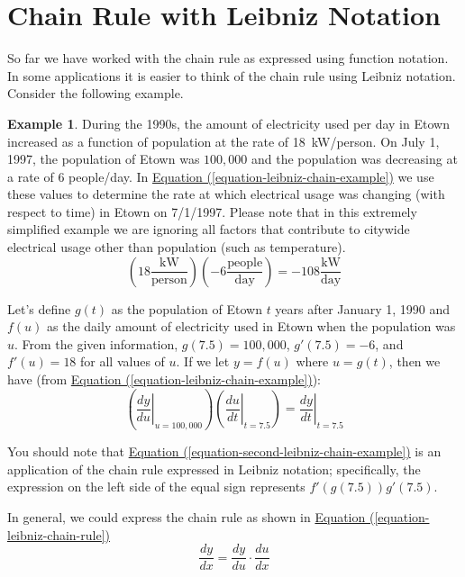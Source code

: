 \documentclass[10pt,oneside,]{book}
\theoremstyle{plain}
\theoremstyle{definition}
\newtheorem{example}[theorem]{Example}
\numberwithin{equation}{section}
\newcommand{\fe}[2]{#1\mathopen{}\left(#2\right)\mathclose{}}
\newcommand{\fd}[1]{#1'}
\newcommand{\lz}[2]{\frac{d#1}{d#2}}
\newcommand{\lzoa}[3]{\left.{\frac{d#1}{d#2}}\right|_{#3}}
\begin{document}
\section[Chain Rule with Leibniz Notation]{Chain Rule with Leibniz Notation}\label{section-chain-rule-and-leibniz}
So far we have worked with the chain rule as expressed using function notation.  In some applications it is easier to think of the chain rule using Leibniz notation. Consider the following example.%
\begin{example}\label{example-17}
During the 1990s, the amount of electricity used per day in Etown increased as a function of population at the rate of \SI{18}{\kilo\watt}/person.  On July 1, 1997, the population of Etown was \(100{,}000\) and the population was decreasing at a rate of 6 people/day.  In \hyperref[equation-leibniz-chain-example]{Equation (\ref{equation-leibniz-chain-example})} we use these values to determine the rate at which electrical usage was changing (with respect to time) in Etown on 7/1/1997.  Please note that in this extremely simplified example we are ignoring all factors that contribute to citywide electrical usage other than population (such as temperature).%
\begin{equation}\left(18\frac{\text{kW}}{\text{person}}\right)\left(-6\frac{\text{people}}{\text{day}}\right)=-108\frac{\text{kW}}{\text{day}}\label{equation-leibniz-chain-example}\end{equation}\par
Let's define \(\fe{g}{t}\)  as the population of Etown \(t\) years after January 1, 1990 and \(\fe{f}{u}\) as the daily amount of electricity used in Etown when the population was \(u\).  From the given information, \(\fe{g}{7.5}=100{,}000\), \(\fe{\fd{g}}{7.5}=-6\), and \(\fe{\fd{f}}{u}=18\) for all values of \(u\).  If we let \(y=\fe{f}{u}\) where \(u=\fe{g}{t}\), then we have (from \hyperref[equation-leibniz-chain-example]{Equation (\ref{equation-leibniz-chain-example})}):%
\begin{equation}\left(\lzoa{y}{u}{u=100{,}000}\right)\left(\lzoa{u}{t}{t=7.5}\right)=\lzoa{y}{t}{t=7.5}\label{equation-second-leibniz-chain-example}\end{equation}\par
You should note that \hyperref[equation-second-leibniz-chain-example]{Equation (\ref{equation-second-leibniz-chain-example})} is an application of the chain rule expressed in Leibniz notation; specifically, the expression on the left side of the equal sign represents \(\fe{\fd{f}}{\fe{g}{7.5}}\fe{\fd{g}}{7.5}\).%
\end{example}
\par
In general, we could express the chain rule as shown in \hyperref[equation-leibniz-chain-rule]{Equation (\ref{equation-leibniz-chain-rule})}%
\begin{equation}\lz{y}{x}=\lz{y}{u}\cdot\lz{u}{x}\label{equation-leibniz-chain-rule}\end{equation}\typeout{************************************************}
\typeout{************************************************}
\end{document}
